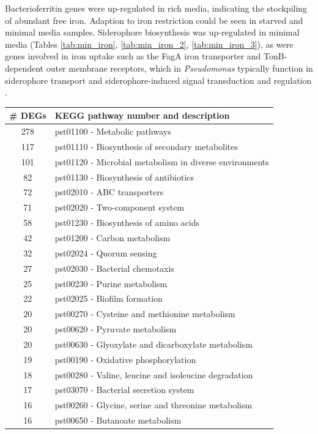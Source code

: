 Bacterioferritin genes were up-regulated in rich media, indicating the stockpiling of abundant free iron. Adaption to iron restriction could be seen in starved and minimal media samples. Siderophore biosynthesis was up-regulated in minimal media (Tables \ref{tab:min_iron}, \ref{tab:min_iron_2}, \ref{tab:min_iron_3}), as were genes involved in iron uptake such as the FagA iron transporter and TonB-dependent outer membrane receptors, which in \textit{Pseudomonas} typically function in siderophore transport and siderophore-induced signal transduction and regulation \citep{lamont-2014}.

{\footnotesize
\begin{longtable}{cl}
    \toprule
    \centering
    \label{tab:pathway_DEGs}
\# DEGs & KEGG pathway number and description \\\midrule
    \endfirsthead
278  & pst01100 - Metabolic pathways \\ 
117  & pst01110 - Biosynthesis of secondary metabolites \\ 
101  & pst01120 - Microbial metabolism in diverse environments \\ 
82  & pst01130 - Biosynthesis of antibiotics \\ 
72  & pst02010 - ABC transporters \\ 
71  & pst02020 - Two-component system \\ 
58  & pst01230 - Biosynthesis of amino acids \\
42  & pst01200 - Carbon metabolism \\ 
32  & pst02024 - Quorum sensing \\ 
27  & pst02030 - Bacterial chemotaxis \\ 
25  & pst00230 - Purine metabolism \\ 
22  & pst02025 - Biofilm formation \\ 
20  & pst00270 - Cysteine and methionine metabolism \\ 
20  & pst00620 - Pyruvate metabolism \\ 
20  & pst00630 - Glyoxylate and dicarboxylate metabolism \\ 
19  & pst00190 - Oxidative phosphorylation \\ 
18  & pst00280 - Valine, leucine and isoleucine degradation \\ 
17  & pst03070 - Bacterial secretion system \\ 
16  & pst00260 - Glycine, serine and threonine metabolism \\ 
16  & pst00650 - Butanoate metabolism \\ 

\end{longtable}}
